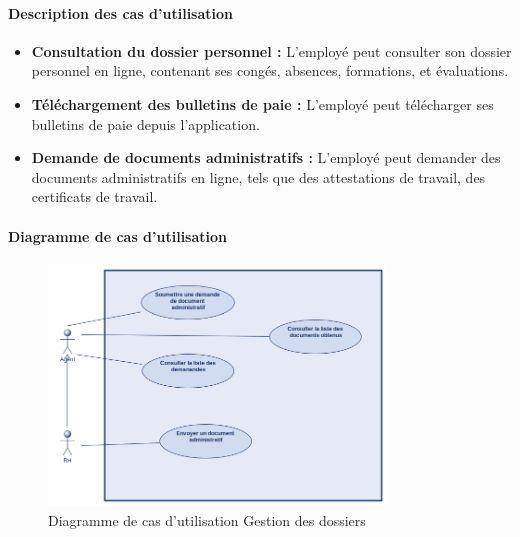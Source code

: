 \paragraph{Description des cas d'utilisation}
\begin{itemize}
    \item \textbf{Consultation du dossier personnel :} L'employé peut consulter son dossier personnel en ligne, contenant ses congés, absences, formations, et évaluations.
    \item \textbf{Téléchargement des bulletins de paie :} L'employé peut télécharger ses bulletins de paie depuis l'application.
    \item \textbf{Demande de documents administratifs :} L'employé peut demander des documents administratifs en ligne, tels que des attestations de travail, des certificats de travail.
\end{itemize}
\paragraph{Diagramme de cas d'utilisation}
\begin{figure}[H]
    \centering
    \includegraphics[width=0.8\textwidth]{images/diagrammes/use-cases/dossiers.png}
    \caption{Diagramme de cas d'utilisation Gestion des dossiers}
    \label{fig:use_case_gestion_dossiers}
\end{figure}
